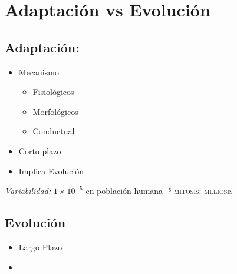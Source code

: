 \section{Adaptación vs Evolución}

\subsection{Adaptación: }
\begin{itemize}
  \item Mecanismo
  \begin{itemize}
    \item Fisiológicos
    \item Morfológicos
    \item Conductual
  \end{itemize}
  \item Corto plazo
  \item Implica Evolución 
\end{itemize}

\textit{Variabilidad:} $1\times 10^{-5}$ en población humana
⁻⁵
\textsc{mitosis: }
\textsc{meliosis}


\subsection{Evolución}
\begin{itemize}
  \item Largo Plazo 
  \item 
\end{itemize}
